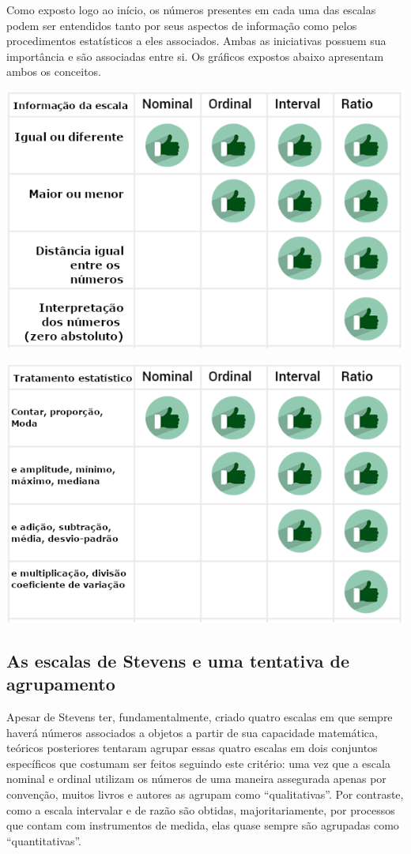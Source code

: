 \documentclass[
]{book}
\begin{document}
Como exposto logo ao início, os números presentes em cada uma das escalas podem ser entendidos tanto por seus aspectos de informação como pelos procedimentos estatísticos a eles associados. Ambas as iniciativas possuem sua importância e são associadas entre si. Os gráficos expostos abaixo apresentam ambos os conceitos.

\includegraphics{./img/cap_escala_medida_informacao.png}

\includegraphics{./img/cap_escala_medida_analises.png}

\hypertarget{as-escalas-de-stevens-e-uma-tentativa-de-agrupamento}{%
\subsection{As escalas de Stevens e uma tentativa de agrupamento}\label{as-escalas-de-stevens-e-uma-tentativa-de-agrupamento}}

Apesar de Stevens ter, fundamentalmente, criado quatro escalas em que sempre haverá números associados a objetos a partir de sua capacidade matemática, teóricos posteriores tentaram agrupar essas quatro escalas em dois conjuntos específicos que costumam ser feitos seguindo este critério: uma vez que a escala nominal e ordinal utilizam os números de uma maneira assegurada apenas por convenção, muitos livros e autores as agrupam como ``qualitativas''. Por contraste, como a escala intervalar e de razão são obtidas, majoritariamente, por processos que contam com instrumentos de medida, elas quase sempre são agrupadas como ``quantitativas''.
\end{document}

